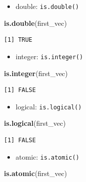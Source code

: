 \documentclass[
]{book}
\newenvironment{Shaded}{\begin{snugshade}}{\end{snugshade}}
\newcommand{\KeywordTok}[1]{\textcolor[rgb]{0.13,0.29,0.53}{\textbf{#1}}}
\newcommand{\NormalTok}[1]{#1}
\providecommand{\tightlist}{%
  \setlength{\itemsep}{0pt}\setlength{\parskip}{0pt}}
\begin{document}
\begin{itemize}
\tightlist
\item
  double: \texttt{is.double()}
\end{itemize}

\begin{Shaded}
\begin{Highlighting}[]
\KeywordTok{is.double}\NormalTok{(first_vec)}
\end{Highlighting}
\end{Shaded}

\begin{verbatim}
[1] TRUE
\end{verbatim}

\begin{itemize}
\tightlist
\item
  integer: \texttt{is.integer()}
\end{itemize}

\begin{Shaded}
\begin{Highlighting}[]
\KeywordTok{is.integer}\NormalTok{(first_vec)}
\end{Highlighting}
\end{Shaded}

\begin{verbatim}
[1] FALSE
\end{verbatim}

\begin{itemize}
\tightlist
\item
  logical: \texttt{is.logical()}
\end{itemize}

\begin{Shaded}
\begin{Highlighting}[]
\KeywordTok{is.logical}\NormalTok{(first_vec)}
\end{Highlighting}
\end{Shaded}

\begin{verbatim}
[1] FALSE
\end{verbatim}

\begin{itemize}
\tightlist
\item
  atomic: \texttt{is.atomic()}
\end{itemize}

\begin{Shaded}
\begin{Highlighting}[]
\KeywordTok{is.atomic}\NormalTok{(first_vec)}
\end{Highlighting}
\end{Shaded}
\end{document}
